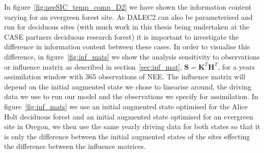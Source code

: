 \documentclass[11pt]{article}
\begin{document}
In figure~\ref{fig:neeSIC_temp_comp_D2} we have shown the information content varying for an evergreen forest site. As DALEC2 can also be parameterised and run for deciduous sites (with much work in this thesis being undertaken at the CASE partners deciduous research forest) it is important to investigate the difference in information content between these cases. In order to visualise this difference, in figure~\ref{fig:inf_mats} we show the analysis sensitivity to observations or influence matrix \citep{Cardinali2004} as described in section~\ref{sec:inf_mat}, \(\textbf{S} = \textbf{K}^{T}\textbf{H}^{T}\), for a years assimilation window with 365 observations of NEE. The influence matrix will depend on the initial augmented state we chose to linearise around, the driving data we use to run our model and the observations we specify for assimilation. In figure~\ref{fig:inf_mats} we use an initial augmented state optimised for the Alice Holt deciduous forest and an initial augmented state optimised for an evergreen site in Oregon, we then use the same yearly driving data for both states so that it is only the difference between the initial augmented states of the sites effecting the difference between the influence matrices.  
\end{document}
